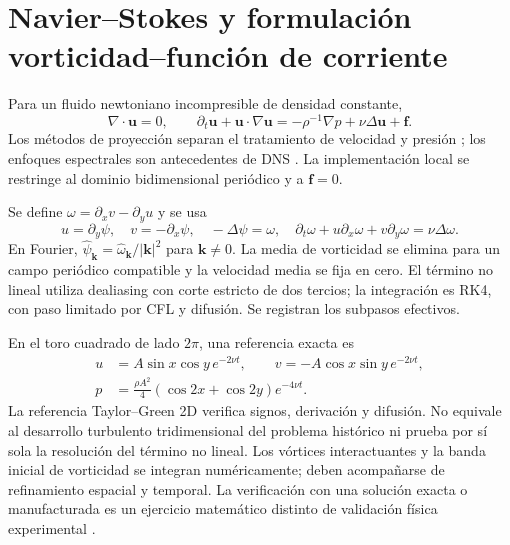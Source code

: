 \documentclass[11pt,oneside,openany]{book}
\begin{document}
\section{Navier--Stokes y formulación vorticidad--función de corriente}
Para un fluido newtoniano incompresible de densidad constante,
\begin{equation}
 \nabla\cdot\boldsymbol u=0,\qquad
 \partial_t\boldsymbol u+\boldsymbol u\cdot\nabla\boldsymbol u
 =-\rho^{-1}\nabla p+\nu\Delta\boldsymbol u+\boldsymbol f.
\end{equation}
Los métodos de proyección separan el tratamiento de velocidad y presión
\citep{chorin1968ns}; los enfoques espectrales son antecedentes de DNS
\citep{orszag1972dns}. La implementación local se restringe al dominio
bidimensional periódico y a $\boldsymbol f=0$.

Se define $\omega=\partial_xv-\partial_yu$ y se usa
\begin{equation}
 u=\partial_y\psi,\quad v=-\partial_x\psi,\quad
 -\Delta\psi=\omega,\quad
 \partial_t\omega+u\partial_x\omega+v\partial_y\omega=\nu\Delta\omega.
\end{equation}
En Fourier, $\widehat\psi_{\boldsymbol k}
=\widehat\omega_{\boldsymbol k}/|\boldsymbol k|^2$ para
$\boldsymbol k\ne0$. La media de vorticidad se elimina para un campo
periódico compatible y la velocidad media se fija en cero. El término
no lineal utiliza dealiasing con corte estricto de dos tercios; la
integración es RK4, con paso limitado por CFL y difusión. Se registran
los subpasos efectivos.

En el toro cuadrado de lado $2\pi$, una referencia exacta es
\begin{align}
 u&=A\sin x\cos y\,e^{-2\nu t},\qquad
 v=-A\cos x\sin y\,e^{-2\nu t},\\
 p&=\frac{\rho A^2}{4}(\cos2x+\cos2y)e^{-4\nu t}.
\end{align}
La referencia Taylor--Green 2D verifica signos, derivación y difusión.
No equivale al desarrollo turbulento tridimensional del problema histórico
\citep{taylorgreen1937} ni prueba por sí sola la resolución del término
no lineal. Los vórtices interactuantes y la banda inicial de vorticidad se
integran numéricamente; deben acompañarse de refinamiento espacial y
temporal. La verificación con una solución exacta o manufacturada es un
ejercicio matemático distinto de validación física experimental
\citep{roache2002mms}.
\end{document}
